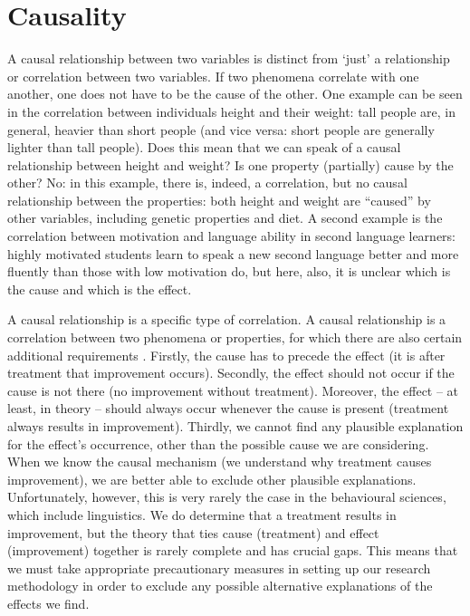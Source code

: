 \documentclass[
]{book}
\begin{document}
\hypertarget{sec:causality}{%
\section{Causality}\label{sec:causality}}

A causal relationship between two variables is distinct from `just' a relationship or correlation between two variables. If two phenomena correlate with one another, one does not have to be the cause of the other. One example can be seen in the correlation between individuals height and their weight: tall people are, in general, heavier than short people (and vice versa: short people are generally lighter than tall people). Does this mean that we can speak of a causal relationship between height and weight? Is one property (partially) cause by the other? No: in this example, there is, indeed, a correlation, but no causal relationship between the properties: both height and weight are ``caused'' by other variables, including genetic properties and diet. A second example is the correlation between motivation and language ability in second language learners: highly motivated students learn to speak a new second language better and more fluently than those with low motivation do, but here, also, it is unclear which is the cause and which is the effect.

A causal relationship is a specific type of correlation. A causal relationship is a correlation between two phenomena or properties, for which there are also certain additional requirements \citep{SCC02}.
Firstly, the cause has to precede the effect (it is after treatment that improvement occurs). Secondly, the effect should not occur if the cause is not there (no improvement without treatment).
Moreover, the effect -- at least, in theory -- should always occur whenever the cause is present (treatment always results in improvement).
Thirdly, we cannot find any plausible explanation for the effect's occurrence, other than the possible cause we are considering. When we know the causal mechanism (we understand why treatment causes improvement), we are better able to exclude other plausible explanations. Unfortunately, however, this is very rarely the case in the behavioural sciences, which include linguistics. We do determine that a treatment results in improvement, but the theory that ties cause (treatment) and effect (improvement) together is rarely complete and has crucial gaps. This means that we must take appropriate precautionary measures in setting up our research methodology in order to exclude any possible alternative explanations of the effects we find.
\end{document}
